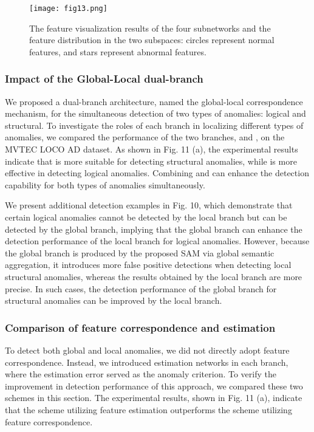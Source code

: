 \documentclass[lettersize,journal]{IEEEtran}
\begin{document}
 \begin{figure}[t]\centering
\texttt{[image: fig13.png]}
\caption{The feature visualization results of the four subnetworks and the feature distribution in the two subspaces: circles represent normal features, and stars represent abnormal features.}
\label{FIG0}
\end{figure}

\subsubsection{Impact of the Global-Local dual-branch}

We proposed a dual-branch architecture, named the global-local correspondence mechanism, for the simultaneous detection of two types of anomalies: logical and structural. To investigate the roles of each branch in localizing different types of anomalies, we compared the performance of the two branches,  and , on the MVTEC LOCO AD dataset. As shown in Fig. 11 (a), the experimental results indicate that  is more suitable for detecting structural anomalies, while  is more effective in detecting logical anomalies. Combining  and  can enhance the detection capability for both types of anomalies simultaneously.

We present additional detection examples in Fig. 10, which demonstrate that certain logical anomalies cannot be detected by the local branch but can be detected by the global branch, implying that the global branch can enhance the detection performance of the local branch for logical anomalies. However, because the global branch is produced by the proposed SAM via global semantic aggregation, it introduces more false positive detections when detecting local structural anomalies, whereas the results obtained by the local branch are more precise. In such cases, the detection performance of the global branch for structural anomalies can be improved by the local branch.


\subsubsection{Comparison of feature correspondence and estimation}

To detect both global and local anomalies, we did not directly adopt feature correspondence. Instead, we introduced estimation networks in each branch, where the estimation error served as the anomaly criterion. To verify the improvement in detection performance of this approach, we compared these two schemes in this section. The experimental results, shown in Fig. 11 (a), indicate that the scheme utilizing feature estimation outperforms the scheme utilizing feature correspondence.
\end{document}
